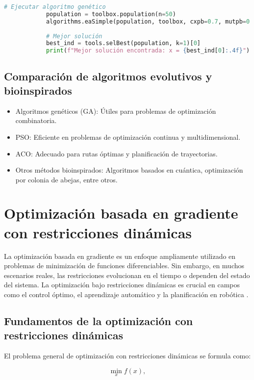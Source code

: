 \begin{itemize}
\begin{lstlisting}[language=Python, caption={Optimización con Algoritmo Genético en Python}]
			# Ejecutar algoritmo genético
			population = toolbox.population(n=50)
			algorithms.eaSimple(population, toolbox, cxpb=0.7, mutpb=0.2, ngen=40, verbose=True)
			
			# Mejor solución
			best_ind = tools.selBest(population, k=1)[0]
			print(f"Mejor solución encontrada: x = {best_ind[0]:.4f}")
		\end{lstlisting}
		
		\subsection{Comparación de algoritmos evolutivos y bioinspirados}
		
		\begin{itemize}
			\item Algoritmos genéticos (GA): Útiles para problemas de optimización combinatoria.
			\item PSO: Eficiente en problemas de optimización continua y multidimensional.
			\item ACO: Adecuado para rutas óptimas y planificación de trayectorias.
			\item Otros métodos bioinspirados: Algoritmos basados en cuántica, optimización por colonia de abejas, entre otros.
		\end{itemize}
		\section{Optimización basada en gradiente con restricciones dinámicas}
		
		La optimización basada en gradiente es un enfoque ampliamente utilizado en problemas de minimización de funciones diferenciables. Sin embargo, en muchos escenarios reales, las restricciones evolucionan en el tiempo o dependen del estado del sistema. La optimización bajo restricciones dinámicas es crucial en campos como el control óptimo, el aprendizaje automático y la planificación en robótica \cite{nocedal2006numerical}.
		
		\subsection{Fundamentos de la optimización con restricciones dinámicas}
		
		El problema general de optimización con restricciones dinámicas se formula como:
		
		\begin{equation}
			\min_{x} f(x),
		\end{equation}
		

\end{itemize}
